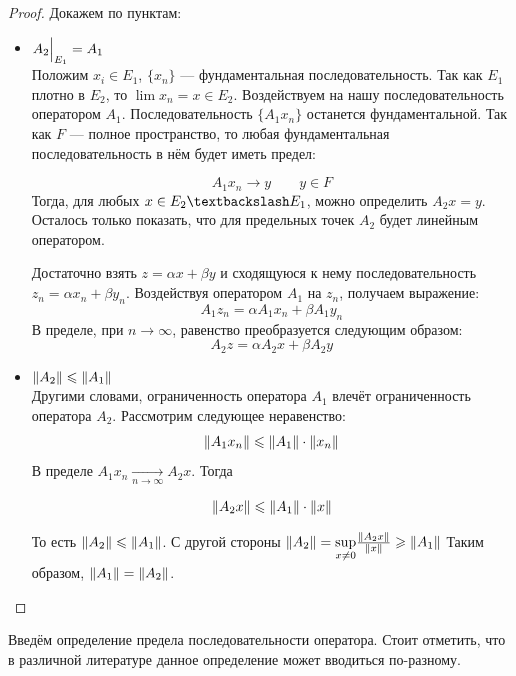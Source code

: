 \documentclass[12pt]{article}
\begin{document}
	\begin{proof}
		Докажем по пунктам:
		\begin{itemize}
			\item $A_2 \Big|_{E_1}^{} = A_1$ \\
			Положим $x_i \in E_1$, $\{x_n\}$ --- фундаментальная последовательность. Так как $E_1$ плотно в $E_2$, то
			$\lim x_n = x\in E_2$. Воздействуем на нашу последовательность оператором $A_1$.
			Последовательность $\{A_1 x_n\}$ останется фундаментальной. Так как $F$ --- полное пространство, 
			то любая фундаментальная последовательность в нём будет иметь предел:
		
			$$A_1x_n \rightarrow y \qquad y \in F$$
			Тогда, для любых $x \in E_2 \textbackslash E_1$, можно определить $A_2 x = y$. Осталось только 
			показать, что для предельных точек $A_2$ будет линейным оператором.
		
			Достаточно взять $z = \alpha x + \beta y$ и сходящуюся к нему последовательность $z_n = \alpha x_n + \beta y_n$.
			Воздействуя оператором $A_1$ на $z_n$, получаем выражение:
			$$A_1 z_n = \alpha A_1 x_n + \beta A_1 y_n$$
			В пределе, при $n \rightarrow \infty$, равенство преобразуется следующим образом:
			$$A_2 z = \alpha A_2 x + \beta A_2 y$$
			
			
			\item $\left\| A_2 \right\| \leqslant \left\| A_1 \right\|$ \\
			Другими словами, ограниченность оператора $A_1$ влечёт ограниченность оператора $A_2$. Рассмотрим следующее 
			неравенство:
			$$\left\| A_1 x_n \right\| \leqslant \left\| A_1 \right\| \cdot \left\| x_n \right\|$$
			В пределе $A_1 x_n \underset{n \rightarrow \infty}{\rightarrow} A_2 x$. Тогда
		
			$$\left\| A_2 x \right\| \leqslant \left\| A_1 \right\| \cdot \left\| x \right\|$$
		
			То есть $\left\| A_2 \right\| \leqslant \left\| A_1 \right\|$. С другой стороны 
			$\left\| A_2 \right\| = \underset{x\neq 0}{\sup} \frac{\left\| A_2x \right\|}{\left\| x \right\|} \geqslant \left\| A_1 \right\|$
			Таким образом, $\left\| A_1 \right\| = \left\| A_2 \right\|$.
		\end{itemize}
	\end{proof}
	
	Введём определение предела последовательности оператора. Стоит отметить, что в различной литературе данное определение может вводиться
	по-разному.
	
\end{document}
